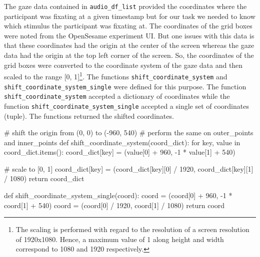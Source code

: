 \documentclass[
  a4paper,
]{article}
\newenvironment{Shaded}{}{}
\newcommand{\CommentTok}[1]{\textcolor[rgb]{0.42,0.45,0.49}{#1}}
\newcommand{\ControlFlowTok}[1]{\textcolor[rgb]{0.84,0.23,0.29}{#1}}
\newcommand{\DecValTok}[1]{\textcolor[rgb]{0.00,0.36,0.77}{#1}}
\newcommand{\KeywordTok}[1]{\textcolor[rgb]{0.84,0.23,0.29}{#1}}
\newcommand{\NormalTok}[1]{\textcolor[rgb]{0.14,0.16,0.18}{#1}}
\newcommand{\OperatorTok}[1]{\textcolor[rgb]{0.14,0.16,0.18}{#1}}
\begin{document}
The gaze data contained in \texttt{audio\_df\_list} provided the
coordinates where the participant was fixating at a given timestamp but
for our task we needed to know which stimulus the participant was
fixating at. The coordinates of the grid boxes were noted from the
OpenSesame experiment UI. But one issues with this data is that these
coordinates had the origin at the center of the screen whereas the gaze
data had the origin at the top left corner of the screen. So, the
coordinates of the grid boxes were converted to the coordinate system of
the gaze data and then scaled to the range {[}0, 1{]}\footnote{The
  scaling is performed with regard to the resolution of a screen
  resolution of 1920x1080. Hence, a maximum value of 1 along height and
  width correspond to 1080 and 1920 respectively.}. The functions
\texttt{shift\_coordinate\_system} and
\texttt{shift\_coordinate\_system\_single} were defined for this
purpose. The function \texttt{shift\_coordinate\_system} accepted a
dictionary of coordinates while the function
\texttt{shift\_coordinate\_system\_single} accepted a single set of
coordinates (tuple). The functions returned the shifted coordinates.

\begin{Shaded}
\begin{Highlighting}[]
\CommentTok{\# shift the origin from (0, 0) to ({-}960, 540)}
\CommentTok{\# perform the same on outer\_points and inner\_points}
\KeywordTok{def}\NormalTok{ shift\_coordinate\_system(coord\_dict):}
    \ControlFlowTok{for}\NormalTok{ key, value }\KeywordTok{in}\NormalTok{ coord\_dict.items():}
\NormalTok{        coord\_dict[key] }\OperatorTok{=}\NormalTok{ (value[}\DecValTok{0}\NormalTok{] }\OperatorTok{+} \DecValTok{960}\NormalTok{, }\OperatorTok{{-}}\DecValTok{1} \OperatorTok{*}\NormalTok{ value[}\DecValTok{1}\NormalTok{] }\OperatorTok{+} \DecValTok{540}\NormalTok{)}
    
        \CommentTok{\# scale to [0, 1]}
\NormalTok{        coord\_dict[key] }\OperatorTok{=}\NormalTok{ (coord\_dict[key][}\DecValTok{0}\NormalTok{] }\OperatorTok{/} \DecValTok{1920}\NormalTok{, coord\_dict[key][}\DecValTok{1}\NormalTok{] }\OperatorTok{/} \DecValTok{1080}\NormalTok{)}
    \ControlFlowTok{return}\NormalTok{ coord\_dict}

\KeywordTok{def}\NormalTok{ shift\_coordinate\_system\_single(coord):}
\NormalTok{    coord }\OperatorTok{=}\NormalTok{ (coord[}\DecValTok{0}\NormalTok{] }\OperatorTok{+} \DecValTok{960}\NormalTok{, }\OperatorTok{{-}}\DecValTok{1} \OperatorTok{*}\NormalTok{ coord[}\DecValTok{1}\NormalTok{] }\OperatorTok{+} \DecValTok{540}\NormalTok{)}
\NormalTok{    coord }\OperatorTok{=}\NormalTok{ (coord[}\DecValTok{0}\NormalTok{] }\OperatorTok{/} \DecValTok{1920}\NormalTok{, coord[}\DecValTok{1}\NormalTok{] }\OperatorTok{/} \DecValTok{1080}\NormalTok{)}
    \ControlFlowTok{return}\NormalTok{ coord}
\end{Highlighting}
\end{Shaded}
\end{document}
